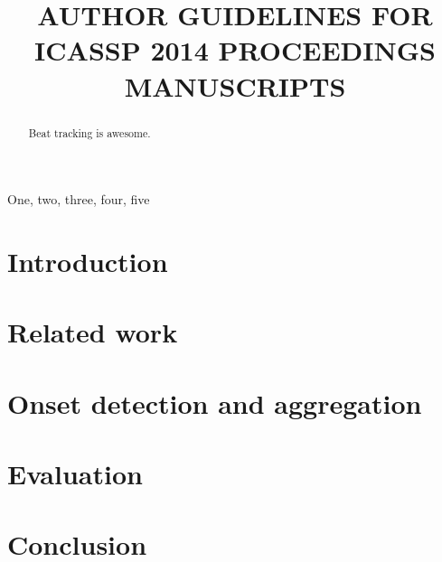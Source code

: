 \documentclass{article}
\title{AUTHOR GUIDELINES FOR ICASSP 2014 PROCEEDINGS MANUSCRIPTS}
\begin{document}
%
\maketitle
%
\begin{abstract}
Beat tracking is awesome.
\end{abstract}
%
\begin{keywords}
One, two, three, four, five
\end{keywords}
%
\section{Introduction}
\label{sec:intro}

\section{Related work}
\label{sec:related}
\cite{holzapfel2012}

\section{Onset detection and aggregation}
\label{sec:onsets}

\section{Evaluation}
\label{sec:eval}

\section{Conclusion}
\label{sec:conclusion}



\end{document}
